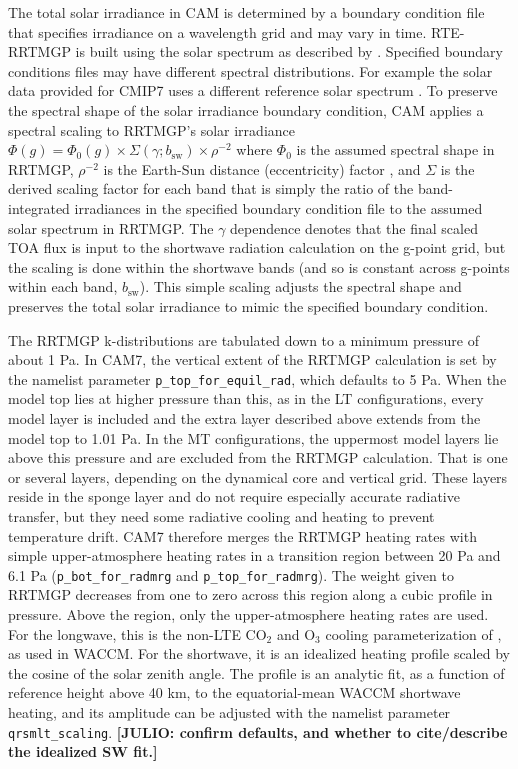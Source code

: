\documentclass[draft]{agujournal2019}
\begin{document}
The total solar irradiance in CAM is determined by a boundary condition file that specifies irradiance on a wavelength grid and may vary in time. RTE-RRTMGP is built using the solar spectrum as described by . Specified boundary conditions files may have different spectral distributions. For example the solar data provided for CMIP7 uses a different reference solar spectrum \cite{Funke:2024}. To preserve the spectral shape of the solar irradiance boundary condition, CAM applies a spectral scaling to RRTMGP's solar irradiance $\Phi(g) = \Phi_0(g) \times \Sigma(\gamma; b_\mathrm{sw}) \times \rho^{-2}$ where $\Phi_0$ is the assumed spectral shape in RRTMGP, $\rho^{-2}$ is the Earth-Sun distance (eccentricity) factor \cite{Berger:1978}, and $\Sigma$ is the derived scaling factor for each band that is simply the ratio of the band-integrated irradiances in the specified boundary condition file to the assumed solar spectrum in RRTMGP. The $\gamma$ dependence denotes that the final scaled TOA flux is input to the shortwave radiation calculation on the g-point grid, but the scaling is done within the shortwave bands (and so is constant across g-points within each band, $b_\mathrm{sw}$). This simple scaling adjusts the spectral shape and preserves the total solar irradiance to mimic the specified boundary condition. 

The RRTMGP k-distributions are tabulated down to a minimum pressure of about 1 Pa. In CAM7, the vertical extent of the RRTMGP calculation is set by the namelist parameter \verb|p_top_for_equil_rad|, which defaults to 5 Pa. When the model top lies at higher pressure than this, as in the LT configurations, every model layer is included and the extra layer described above extends from the model top to 1.01 Pa. In the MT configurations, the uppermost model layers lie above this pressure and are excluded from the RRTMGP calculation. That is one or several layers, depending on the dynamical core and vertical grid. These layers reside in the sponge layer and do not require especially accurate radiative transfer, but they need some radiative cooling and heating to prevent temperature drift. CAM7 therefore merges the RRTMGP heating rates with simple upper-atmosphere heating rates in a transition region between 20 Pa and 6.1 Pa (\verb|p_bot_for_radmrg| and \verb|p_top_for_radmrg|). The weight given to RRTMGP decreases from one to zero across this region along a cubic profile in pressure. Above the region, only the upper-atmosphere heating rates are used. For the longwave, this is the non-LTE CO$_2$ and O$_3$ cooling parameterization of , as used in WACCM. For the shortwave, it is an idealized heating profile scaled by the cosine of the solar zenith angle. The profile is an analytic fit, as a function of reference height above 40 km, to the equatorial-mean WACCM shortwave heating, and its amplitude can be adjusted with the namelist parameter \verb|qrsmlt_scaling|. \textbf{[JULIO: confirm defaults, and whether to cite/describe the idealized SW fit.]}
\end{document}
